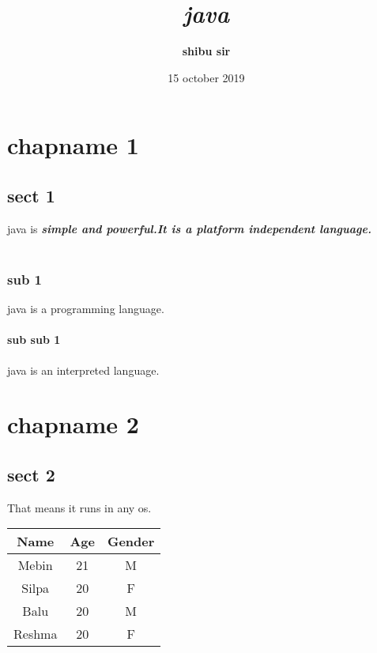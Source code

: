 \documentclass[12pt]{report}
\begin{document}
\title{\textit{java}}
\author{\textbf{shibu sir}}

\date{ 15 october 2019 }
\maketitle

\chapter{chapname 1}


\section{sect 1}
java is \textit{\textbf{simple and powerful.It is a platform independent language.}}\\ \\
\subsection*{sub 1}
java is a programming language.
\subsubsection*{sub sub 1}
java is an interpreted language.

\chapter{chapname 2}
\section{sect 2}That means it runs in any os.\\
\begin{center}

\begin{tabular}{|c|c|c|}
\hline
Name & Age & Gender \\
\hline
Mebin & 21 & M \\
\hline
Silpa & 20 & F \\
\hline
Balu  & 20 & M  \\
\hline
Reshma & 20 & F \\
\hline


\end{tabular}
\end{center}
\end{document}
